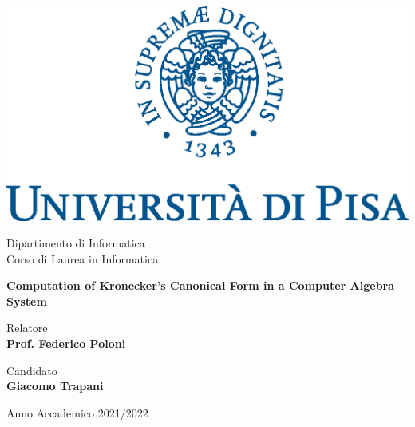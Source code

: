 \documentclass[12pt]{report}
\theoremstyle{definition}
\theoremstyle{definition}
\begin{document}
\begin{titlepage}
    \clearpage\thispagestyle{empty}
    \centering
    \vspace{1cm}

    \includegraphics[scale=0.58]{images/unipi-marchio.eps}

    {\normalsize \noindent Dipartimento di Informatica \\
            Corso di Laurea in Informatica \par}
    
    \vspace{2cm}
    {\huge \textbf{Computation of Kronecker's Canonical Form in a Computer Algebra System} \par }

    \vspace{3cm}

    \begin{minipage}[t]{0.47\textwidth}
        {\large{Relatore \\ \textbf{Prof. Federico Poloni}}}
    \end{minipage}\hfill\begin{minipage}[t]{0.47\textwidth}\raggedleft
        {\large {Candidato \\ \textbf{Giacomo Trapani}}}
    \end{minipage}

    \vspace{3cm}

    {\normalsize Anno Accademico 2021/2022 \par}

    \pagebreak
\end{titlepage}
\setcounter{chapter}{-1}
\tableofcontents
\listofalgocfs
\pagebreak

\pagebreak

\pagebreak

\pagebreak

\pagebreak

\pagebreak

\pagebreak

\end{document}
